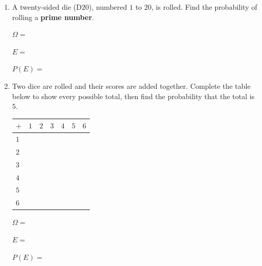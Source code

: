 \documentclass[11pt]{article}
\newcommand{\answork}{%
  \par\vspace{0.2em}
  \noindent $\Omega = $\hrulefill\par\vspace{0.2em}
  \noindent $E = $\hrulefill\par\vspace{0.2em}
  \noindent $P(E) = $\hrulefill\par\vspace{0.2em}
}
\begin{document}
\begin{enumerate}[label=(\alph*), resume]
  \item A twenty-sided die (D$20$), numbered $1$ to $20$, is rolled. Find the probability of
    rolling a \textbf{prime number}.
  \answork
  \item Two dice are rolled and their scores are added together. Complete the table below to
    show every possible total, then find the probability that the total is $5$.

  \begin{center}
  \begin{tabular}{|Z|Z|Z|Z|Z|Z|Z|}
  \hline
  $+$ & $1$ & $2$ & $3$ & $4$ & $5$ & $6$ \\\hline
  $1$ & \rule{0pt}{0.9cm} & & & & & \\\hline
  $2$ & \rule{0pt}{0.9cm} & & & & & \\\hline
  $3$ & \rule{0pt}{0.9cm} & & & & & \\\hline
  $4$ & \rule{0pt}{0.9cm} & & & & & \\\hline
  $5$ & \rule{0pt}{0.9cm} & & & & & \\\hline
  $6$ & \rule{0pt}{0.9cm} & & & & & \\\hline
  \end{tabular}
  \end{center}
  \answork
\end{enumerate}
\end{document}
